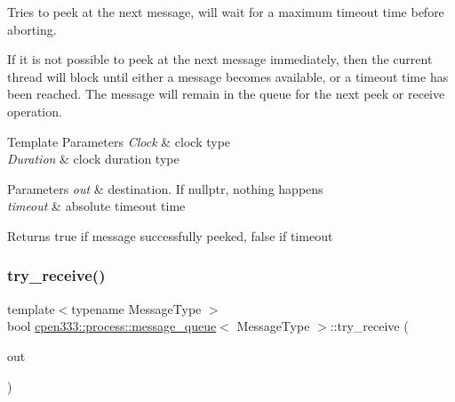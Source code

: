 Tries to peek at the next message, will wait for a maximum timeout time before aborting. 

If it is not possible to peek at the next message immediately, then the current thread will block until either a message becomes available, or a timeout time has been reached. The message will remain in the queue for the next {\ttfamily peek} or {\ttfamily receive} operation.


\begin{DoxyTemplParams}{Template Parameters}
{\em Clock} & clock type \\
\hline
{\em Duration} & clock duration type \\
\hline
\end{DoxyTemplParams}

\begin{DoxyParams}{Parameters}
{\em out} & destination. If {\ttfamily nullptr}, nothing happens \\
\hline
{\em timeout} & absolute timeout time \\
\hline
\end{DoxyParams}
\begin{DoxyReturn}{Returns}
{\ttfamily true} if message successfully peeked, {\ttfamily false} if timeout 
\end{DoxyReturn}
\mbox{\label{classcpen333_1_1process_1_1message__queue_ae42a9bd9edc9753a38fa63f20a34cc60}} 
\subsubsection{\texorpdfstring{try\+\_\+receive()}{try\_receive()}}
{\footnotesize\ttfamily template$<$typename Message\+Type $>$ \\
bool \hyperlink{classcpen333_1_1process_1_1message__queue}{cpen333\+::process\+::message\+\_\+queue}$<$ Message\+Type $>$\+::try\+\_\+receive (\begin{DoxyParamCaption}\item[{Message\+Type $\ast$}]{out }\end{DoxyParamCaption})\hspace{0.3cm}{\ttfamily [inline]}}




